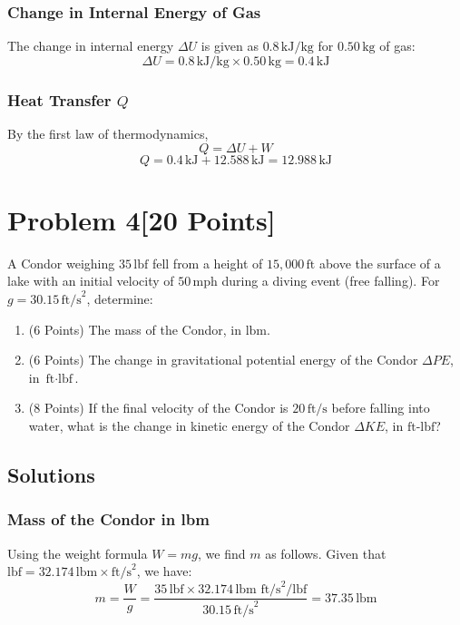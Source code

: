 \documentclass{article}
\begin{document}
\subsubsection*{Change in Internal Energy of Gas}
The change in internal energy \( \Delta U \) is given as \(0.8 \, \text{kJ/kg}\) for \(0.50 \, \text{kg}\) of gas:
\[
\Delta U = 0.8 \, \text{kJ/kg} \times 0.50 \, \text{kg} = 0.4 \, \text{kJ}
\]

\subsubsection*{Heat Transfer \(Q\)}
By the first law of thermodynamics,
\[
Q = \Delta U + W
\]
\[
Q = 0.4 \, \text{kJ} + 12.588 \, \text{kJ} = 12.988 \, \text{kJ}
\]


\newpage
\section*{Problem 4[20 Points]}
A Condor weighing \(35 \, \text{lbf}\) fell from a height of \(15,000 \, \text{ft}\) above the surface of a lake with an initial velocity of \(50 \, \text{mph}\) during a diving event (free falling). For \(g = 30.15 \, \text{ft/s}^2\), determine:
\begin{enumerate}
    \item (6 Points) The mass of the Condor, in \(\text{lbm}\).
    \item (6 Points) The change in gravitational potential energy of the Condor \(\Delta PE\), in \(\text{ft} \cdot \text{lbf}\).
    \item (8 Points) If the final velocity of the Condor is \(20 \, \text{ft/s}\) before falling into water, what is the change in kinetic energy of the Condor \(\Delta KE\), in \(\text{ft-lbf}\)?
\end{enumerate}

\subsection*{Solutions}

\subsubsection*{Mass of the Condor in lbm}
Using the weight formula \(W = mg\), we find \(m\) as follows. Given that \( \text{lbf} = 32.174 \, \text{lbm} \times \text{ft/s}^2 \), we have:
\[
m = \frac{W}{g} = \frac{35 \, \text{lbf} \times 32.174 \, \text{lbm ft/s}^2/\text{lbf}}{30.15 \, \text{ft/s}^2} = 37.35 \, \text{lbm}
\]
\end{document}
